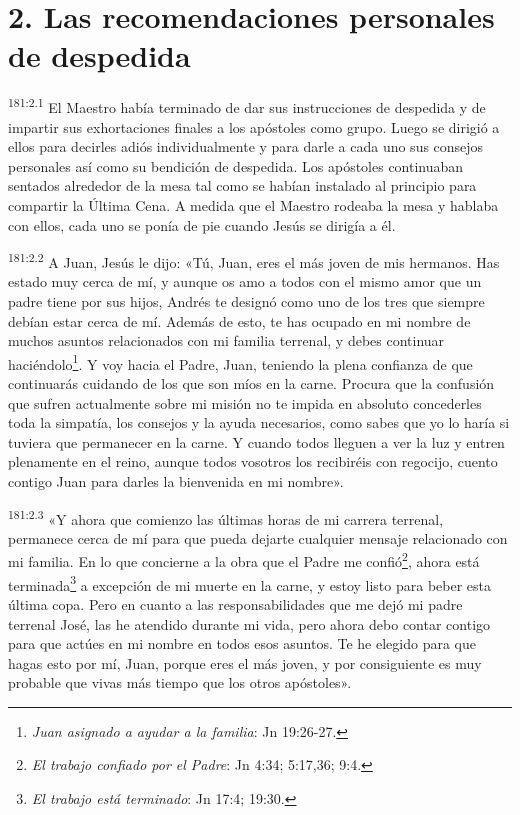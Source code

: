 \section*{2. Las recomendaciones personales de despedida}
\par 
\textsuperscript{181:2.1} El Maestro había terminado de dar sus instrucciones de despedida y de impartir sus exhortaciones finales a los apóstoles como grupo. Luego se dirigió a ellos para decirles adiós individualmente y para darle a cada uno sus consejos personales así como su bendición de despedida. Los apóstoles continuaban sentados alrededor de la mesa tal como se habían instalado al principio para compartir la Última Cena. A medida que el Maestro rodeaba la mesa y hablaba con ellos, cada uno se ponía de pie cuando Jesús se dirigía a él.

\par 
\textsuperscript{181:2.2} A Juan, Jesús le dijo: «Tú, Juan, eres el más joven de mis hermanos. Has estado muy cerca de mí, y aunque os amo a todos con el mismo amor que un padre tiene por sus hijos, Andrés te designó como uno de los tres que siempre debían estar cerca de mí. Además de esto, te has ocupado en mi nombre de muchos asuntos relacionados con mi familia terrenal, y debes continuar haciéndolo\footnote{\textit{Juan asignado a ayudar a la familia}: Jn 19:26-27.}. Y voy hacia el Padre, Juan, teniendo la plena confianza de que continuarás cuidando de los que son míos en la carne. Procura que la confusión que sufren actualmente sobre mi misión no te impida en absoluto concederles toda la simpatía, los consejos y la ayuda necesarios, como sabes que yo lo haría si tuviera que permanecer en la carne. Y cuando todos lleguen a ver la luz y entren plenamente en el reino, aunque todos vosotros los recibiréis con regocijo, cuento contigo Juan para darles la bienvenida en mi nombre».

\par 
\textsuperscript{181:2.3} «Y ahora que comienzo las últimas horas de mi carrera terrenal, permanece cerca de mí para que pueda dejarte cualquier mensaje relacionado con mi familia. En lo que concierne a la obra que el Padre me confió\footnote{\textit{El trabajo confiado por el Padre}: Jn 4:34; 5:17,36; 9:4.}, ahora está terminada\footnote{\textit{El trabajo está terminado}: Jn 17:4; 19:30.} a excepción de mi muerte en la carne, y estoy listo para beber esta última copa. Pero en cuanto a las responsabilidades que me dejó mi padre terrenal José, las he atendido durante mi vida, pero ahora debo contar contigo para que actúes en mi nombre en todos esos asuntos. Te he elegido para que hagas esto por mí, Juan, porque eres el más joven, y por consiguiente es muy probable que vivas más tiempo que los otros apóstoles».

